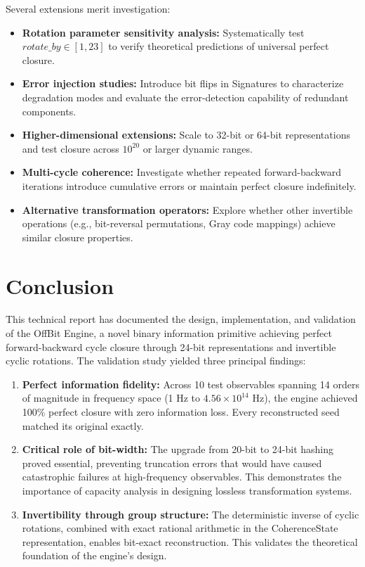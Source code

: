 \documentclass[11pt,letterpaper]{article}
\begin{document}
Several extensions merit investigation:

\begin{itemize}
    \item \textbf{Rotation parameter sensitivity analysis:} Systematically test $rotate\_by \in [1, 23]$ to verify theoretical predictions of universal perfect closure.

    \item \textbf{Error injection studies:} Introduce bit flips in Signatures to characterize degradation modes and evaluate the error-detection capability of redundant components.

    \item \textbf{Higher-dimensional extensions:} Scale to 32-bit or 64-bit representations and test closure across $10^{20}$ or larger dynamic ranges.

    \item \textbf{Multi-cycle coherence:} Investigate whether repeated forward-backward iterations introduce cumulative errors or maintain perfect closure indefinitely.

    \item \textbf{Alternative transformation operators:} Explore whether other invertible operations (e.g., bit-reversal permutations, Gray code mappings) achieve similar closure properties.
\end{itemize}

\section{Conclusion}
\label{sec:conclusion}

This technical report has documented the design, implementation, and validation of the OffBit Engine, a novel binary information primitive achieving perfect forward-backward cycle closure through 24-bit representations and invertible cyclic rotations. The validation study yielded three principal findings:

\begin{enumerate}
    \item \textbf{Perfect information fidelity:} Across 10 test observables spanning 14 orders of magnitude in frequency space (1 Hz to $4.56 \times 10^{14}$ Hz), the engine achieved 100\% perfect closure with zero information loss. Every reconstructed seed matched its original exactly.

    \item \textbf{Critical role of bit-width:} The upgrade from 20-bit to 24-bit hashing proved essential, preventing truncation errors that would have caused catastrophic failures at high-frequency observables. This demonstrates the importance of capacity analysis in designing lossless transformation systems.

    \item \textbf{Invertibility through group structure:} The deterministic inverse of cyclic rotations, combined with exact rational arithmetic in the CoherenceState representation, enables bit-exact reconstruction. This validates the theoretical foundation of the engine's design.
\end{enumerate}
\end{document}
